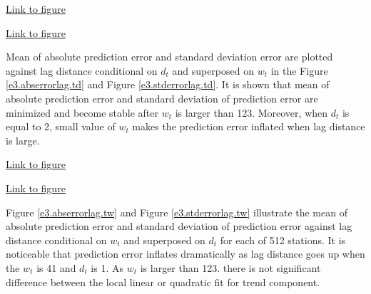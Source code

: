 \begin{framed}
\begin{center}
  \href{../plots/a1950/E3/tmax.absmeans.vs.lag.td.pdf}{Link to figure}
  \label{e3.abserrorlag.td}
\end{center}
\end{framed}

\begin{framed}
\begin{center}
  \href{../plots/a1950/E3/tmax.std.vs.lag.td.pdf}{Link to figure}
  \label{e3.stderrorlag.td}
\end{center}
\end{framed}

Mean of absolute prediction error and standard deviation error are plotted 
against lag distance conditional on $d_t$ and superposed on $w_t$ in the
Figure 
\href{../plots/a1950/E3/tmax.absmeans.vs.lag.td.pdf}{\ref*{e3.abserrorlag.td}} 
and Figure 
\href{../plots/a1950/E3/tmax.std.vs.lag.td.pdf}{\ref*{e3.stderrorlag.td}}. 
It is shown that mean of absolute prediction error and standard deviation of
prediction error
are minimized and become stable after $w_t$ is larger than 123. Moreover, when
$d_t$ is equal to 2, small value of $w_t$ makes the prediction error inflated
when lag distance is large. 

\begin{framed}
\begin{center}
  \href{../plots/a1950/E3/tmax.absmeans.vs.lag.tw.pdf}{Link to figure}
  \label{e3.abserrorlag.tw}
\end{center}
\end{framed}

\begin{framed}
\begin{center}
  \href{../plots/a1950/E3/tmax.std.vs.lag.tw.pdf}{Link to figure}
  \label{e3.stderrorlag.tw}
\end{center}
\end{framed}

Figure 
\href{../plots/a1950/E3/tmax.absmeans.vs.lag.tw.pdf}{\ref*{e3.abserrorlag.tw}} 
and Figure 
\href{../plots/a1950/E3/tmax.std.vs.lag.tw.pdf}{\ref*{e3.stderrorlag.tw}} 
illustrate the mean of absolute prediction error and standard deviation of 
prediction error against lag distance conditional on $w_t$ and superposed on 
$d_t$ for each of 512 stations. It is noticeable that prediction error inflates
dramatically as lag distance goes up when the $w_t$ is 41 and $d_t$ is 1.
As $w_t$ is larger than 123. there is not significant difference between the 
local linear or quadratic fit for trend component.


